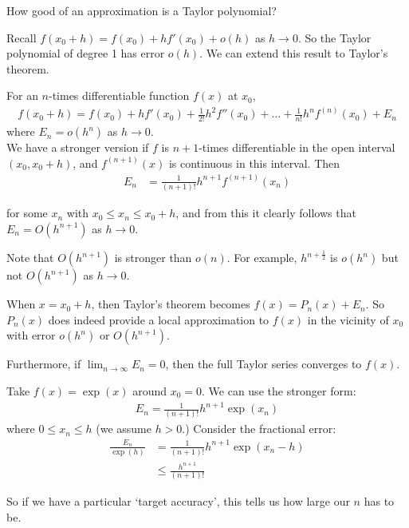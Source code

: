 \documentclass{../../template/note}
\begin{document}
    How good of an approximation is a Taylor polynomial?

    Recall \(f(x_0+h)=f(x_0)+hf'(x_0)+o(h)\) as \(h \to 0\). So the Taylor polynomial of degree 1 has error \(o(h)\). We can extend this result to Taylor's theorem.

    \begin{theorem}
        For an \(n\)-times differentiable function \(f(x)\) at \(x_0\),
        \begin{align*}
            f(x_0+h) = f(x_0) + hf'(x_0) + \frac{1}{2!}h^2f''(x_0) + \dots + \frac{1}{n!}h^n f^{(n)}(x_0) + E_n
        \end{align*}
        where \(E_n = o(h^n)\) as \(h \to 0\). \\
    
        We have a stronger version if \(f\) is \(n+1\)-times differentiable in the open interval \((x_0, x_0+h)\), and \(f^{(n+1)}(x)\) is continuous in this interval. Then
        \begin{align*}
            E_n &= \frac{1}{(n+1)!}h^{n+1}f^{(n+1)}(x_n)
        \end{align*}
        
        for some \(x_n\) with \(x_0 \leq x_n \leq x_0+h\), and from this it clearly follows that \(E_n = O(h^{n+1})\) as \(h \to 0\).
        
        
    \end{theorem}
    
    \begin{remark*}
        Note that \(O(h^{n+1})\) is stronger than \(o(n)\). For example, \(h^{n+\frac 1 2}\) is \(o(h^n)\) but not \(O(h^{n+1})\) as \(h \to 0\).
    \end{remark*}
    
    When \(x = x_0 + h\), then Taylor's theorem becomes \(f(x) = P_n(x) + E_n\). So \(P_n(x)\) does indeed provide a local approximation to \(f(x)\) in the vicinity of \(x_0\) with error \(o(h^n)\) or \(O(h^{n+1})\).

    Furthermore, if \(\lim_{n \to \infty}E_n = 0\), then the full Taylor series converges to \(f(x)\).
    
    \begin{example}
        Take \(f(x) = \exp(x)\) around \(x_0 = 0\). We can use the stronger form:
        \begin{align*}
            E_n = \frac{1}{(n+1)!}h^{n+1}\exp(x_n)
        \end{align*}
        where \(0 \leq x_n \leq h\) (we assume \(h > 0\).) Consider the fractional error:
        \begin{align*}
            \frac{E_n}{\exp(h)} &= \frac{1}{(n+1)!}h^{n+1}\exp(x_n-h) \\
            &\leq \frac{h^{n+1}}{(n+1)!}
        \end{align*}
        
        \noindent So if we have a particular `target accuracy', this tells us how large our \(n\) has to be.
        
    \end{example}
    
\end{document}
